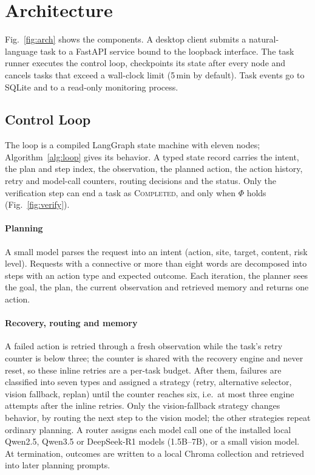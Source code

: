 \section{Architecture}
\label{sec:arch}



Fig.~\ref{fig:arch} shows the components. A desktop client submits a natural-language task to a FastAPI service bound to the loopback interface. The task runner executes the control loop, checkpoints its state after every node and cancels tasks that exceed a wall-clock limit (5\,min by default). Task events go to SQLite and to a read-only monitoring process.

\subsection{Control Loop}
\label{sec:loop}

The loop is a compiled LangGraph state machine with eleven nodes; Algorithm~\ref{alg:loop} gives its behavior. A typed state record carries the intent, the plan and step index, the observation, the planned action, the action history, retry and model-call counters, routing decisions and the status. Only the verification step can end a task as \textsc{Completed}, and only when $\Phi$ holds (Fig.~\ref{fig:verify}).



\paragraph{Planning} A small model parses the request into an intent (action, site, target, content, risk level). Requests with a connective or more than eight words are decomposed into steps with an action type and expected outcome. Each iteration, the planner sees the goal, the plan, the current observation and retrieved memory and returns one action.

\paragraph{Recovery, routing and memory} A failed action is retried through a fresh observation while the task's retry counter is below three; the counter is shared with the recovery engine and never reset, so these inline retries are a per-task budget. After them, failures are classified into seven types and assigned a strategy (retry, alternative selector, vision fallback, replan) until the counter reaches six, i.e.\ at most three engine attempts after the inline retries. Only the vision-fallback strategy changes behavior, by routing the next step to the vision model; the other strategies repeat ordinary planning. A router assigns each model call one of the installed local Qwen2.5, Qwen3.5 or DeepSeek-R1 models (1.5B--7B), or a small vision model. At termination, outcomes are written to a local Chroma collection and retrieved into later planning prompts.

